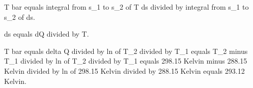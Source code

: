 T bar equals integral from s_1 to s_2 of T ds divided by integral from s_1 to s_2 of ds.  

ds equals dQ divided by T.  

T bar equals delta Q divided by ln of T_2 divided by T_1 equals T_2 minus T_1 divided by ln of T_2 divided by T_1 equals 298.15 Kelvin minus 288.15 Kelvin divided by ln of 298.15 Kelvin divided by 288.15 Kelvin equals 293.12 Kelvin.